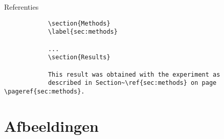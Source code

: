 \documentclass[
    dutch,
    everyoneauthor=true,
    defaultSlideCollection=vincent,
]{../../cursuspresentatie}
\begin{document}



\begin{frame}[fragile]{Referenties}
    \begin{codebox}
        \begin{verbatim}
            \section{Methods}
            \label{sec:methods}

            ...
            \section{Results}

            This result was obtained with the experiment as
            described in Section~\ref{sec:methods} on page \pageref{sec:methods}.
        \end{verbatim}
    \end{codebox}
\end{frame}

\section{Afbeeldingen}\label{sec:afbeeldingen}
\def\placetarget{\hypertarget{afbeeldingen}{}}






\end{document}
